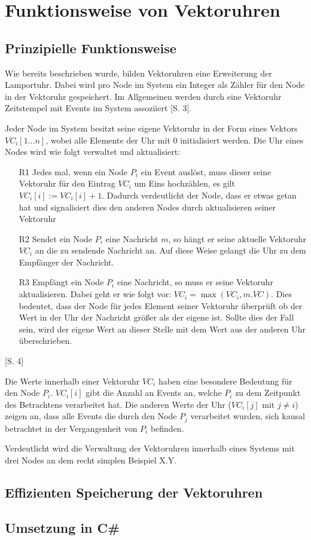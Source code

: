 \section{Funktionsweise von Vektoruhren}
\subsection{Prinzipielle Funktionsweise}

Wie bereits beschrieben wurde, bilden Vektoruhren eine Erweiterung der Lamportuhr. Dabei wird pro Node im System ein Integer als Zähler für den Node in der Vektoruhr gespeichert. Im Allgemeinen werden durch eine Vektoruhr Zeitstempel mit Events im System assoziiert \cite{Baldoni:2002:FDC:1435723.1437765}[S. 3].

Jeder Node im System besitzt seine eigene Vektoruhr in der Form eines Vektors $VC_i[1...n]$, wobei alle Elemente der Uhr mit $0$ initialisiert werden. Die Uhr eines Nodes wird wie folgt verwaltet und aktualisiert:

\begin{itemize}
	\item[R1]Jedes mal, wenn ein Node $P_i$ ein Event auslöst, muss dieser seine Vektoruhr für den Eintrag $VC_i$ um Eins hochzählen, es gilt  $VC_i[i] := VC_i[i] + 1$. Dadurch verdeutlicht der Node, dass er etwas getan hat und signalisiert dies den anderen Nodes durch aktualisieren seiner Vektoruhr 
	\item[R2]Sendet ein Node $P_i$ eine Nachricht $m$, so hängt er seine aktuelle Vektoruhr $VC_i$ an die zu sendende Nachricht an. Auf diese Weise gelangt die Uhr zu dem Empfänger der Nachricht.
	\item[R3]Empfängt ein Node $P_i$ eine Nachricht, so muss er seine Vektoruhr aktualisieren. Dabei geht er wie folgt vor: $VC_i = \max(VC_i, m.VC)$. Dies bedeutet, dass der Node für jedes Element seiner Vektoruhr überprüft ob der Wert in der Uhr der Nachricht größer als der eigene ist. Sollte dies der Fall sein, wird der eigene Wert an dieser Stelle mit dem Wert aus der anderen Uhr überschrieben.
\end{itemize} \cite{Baldoni:2002:FDC:1435723.1437765}[S. 4]

Die Werte innerhalb einer Vektoruhr $VC_i$ haben eine besondere Bedeutung für den Node $P_i$. $VC_i[i]$ gibt die Anzahl an Events an, welche $P_i$ zu dem Zeitpunkt des Betrachtens verarbeitet hat. Die anderen Werte der Uhr ($VC_i[j]$ mit $j \neq i$) zeigen an, dass alle Events die durch den Node $P_j$ verarbeitet wurden, sich kausal betrachtet in der Vergangenheit von $P_i$ befinden.

Verdeutlicht wird die Verwaltung der Vektoruhren innerhalb eines Systems mit drei Nodes an dem recht simplen Beispiel X.Y.

\subsection{Effizienten Speicherung der Vektoruhren}
\subsection{Umsetzung in C\#}

